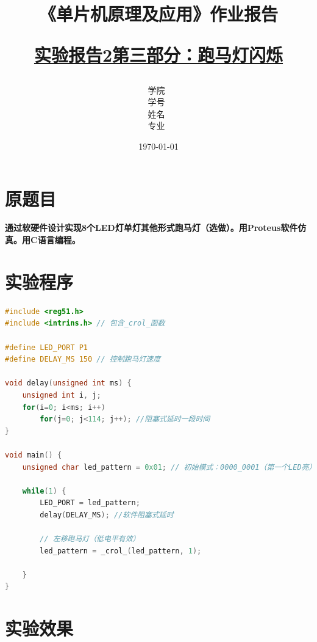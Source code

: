 \documentclass[12pt,hyperref,a4paper,UTF8]{ctexart}
\title{ 
        \vspace{1cm}
        \heiti \Huge \textbf{《单片机原理及应用》作业报告} \par
        \vspace{1cm} 
        \heiti \Large {\underline{实验报告2第三部分：跑马灯闪烁}   } 
        \vspace{3cm}
    
    }
\author{
        \vspace{0.5cm}
        \kaishu\Large 学院\ \dlmu[9cm]{卓越学院} \\ %
        \vspace{0.5cm}
        \kaishu\Large 学号\ \dlmu[9cm]{23040447} \\ %
        \vspace{0.5cm}
        \kaishu\Large 姓名\ \dlmu[9cm]{陈文轩} \qquad  \\ %
        \vspace{0.5cm}
        \kaishu\Large 专业\ \dlmu[9cm]{智能硬件与系统(电子信息工程)} \qquad \\ %
    }
\date{\today} %
\begin{document}
\cover
\thispagestyle{empty} %







\newpage
\setcounter{page}{1} %


\section{原题目}

\textbf{通过软硬件设计实现8个LED灯单灯其他形式跑马灯（选做）。用Proteus软件仿真。用C语言编程。}

\section{实验程序}
\begin{lstlisting}[language=C, caption={跑马灯实验程序}]
#include <reg51.h>
#include <intrins.h> // 包含_crol_函数

#define LED_PORT P1
#define DELAY_MS 150 // 控制跑马灯速度

void delay(unsigned int ms) {
    unsigned int i, j;
    for(i=0; i<ms; i++)
        for(j=0; j<114; j++); //阻塞式延时一段时间
}

void main() {
    unsigned char led_pattern = 0x01; // 初始模式：0000_0001（第一个LED亮）
    
    while(1) {
        LED_PORT = led_pattern;
        delay(DELAY_MS); //软件阻塞式延时
        
        // 左移跑马灯（低电平有效）
        led_pattern = _crol_(led_pattern, 1);
        
    }
}  
\end{lstlisting}

\section{实验效果}
\end{document}
